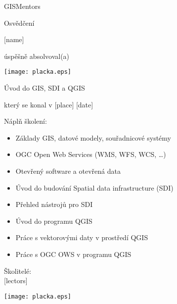\documentclass[12pt, a4paper]{letter}
\begin{document}
\pagestyle{empty}
\begin{center}

{\Large GISMentors}

{\Huge Osvědčení}

{\Large [name]}

úspěšně absolvoval(a)

\texttt{[image: placka.eps]}

{\Large Úvod do GIS, SDI a QGIS}

který se konal v [place] [date]
\end{center}

Náplň školení:

\begin{itemize}
    \item Základy GIS, datové modely, souřadnicové systémy
    \item OGC Open Web Services (WMS, WFS, WCS, \dots)
    \item Otevřený software a otevřená data
    \item Úvod do budování Spatial data infrastructure (SDI)
    \item Přehled nástrojů pro SDI
    \item Úvod do programu QGIS
    \item Práce s vektorovými daty v prostředí QGIS
    \item Práce s OGC OWS v programu QGIS
\end{itemize}

\vfill
\parbox{7cm}{

    Školitelé: \\

    [lectors]
}
\hfill
\parbox{3cm}{
    \texttt{[image: placka.eps]}
}


\begin{center}
\end{center}
\end{document}
